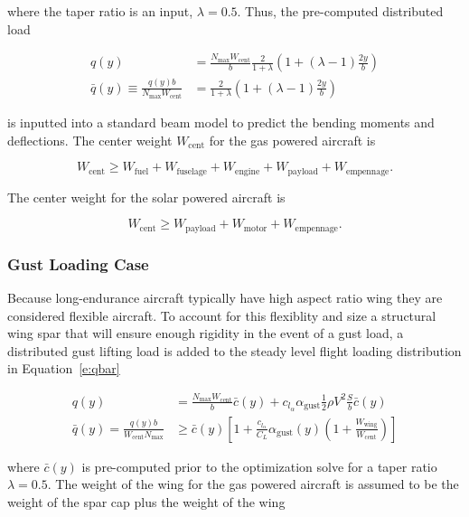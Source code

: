 \documentclass[]{aiaa-tc}%
\begin{document}
where the taper ratio is an input, $\lambda=0.5$.  Thus, the pre-computed distributed load 

\begin{align}
    \label{e:qbar}
    q(y) &= \frac{N_{\text{max}}W_{\text{cent}}}{b}\frac{2}{1+\lambda} \left( 1 + (\lambda - 1) \frac{2y}{b} \right) \\
    \bar{q}(y) \equiv \frac{q(y)b}{N_{\text{max}}W_{\text{cent}}} &= \frac{2}{1+\lambda} \left( 1 + (\lambda - 1) \frac{2y}{b} \right)
\end{align}

is inputted into a standard beam model to predict the bending moments and deflections. The center weight $W_{\text{cent}}$ for the gas powered aircraft is

\begin{equation}
    W_{\text{cent}} \geq W_{\text{fuel}} + W_{\text{fuselage}} + W_{\text{engine}} + W_{\text{payload}} + W_{\text{empennage}}.
\end{equation}

The center weight for the solar powered aircraft is

\begin{equation}
    W_{\text{cent}} \geq W_{\text{payload}} + W_{\text{motor}} + W_{\text{empennage}}.
\end{equation}


\subsubsection{Gust Loading Case}

Because long-endurance aircraft typically have high aspect ratio wing they are considered flexible aircraft. 
To account for this flexiblity and size a structural wing spar that will ensure enough rigidity in the event of a gust load, a distributed gust lifting load is added to the steady level flight loading distribution in Equation~\ref{e:qbar}

\begin{align}
    q(y) &= \frac{N_{\text{max}}W_{\text{cent}}}{b}\bar{c}(y) + c_{l_{\alpha}} \alpha_{\text{gust}} \frac{1}{2} \rho V^2 \frac{S}{b}\bar{c}(y) \\
    \bar{q}(y) = \frac{q(y)b}{W_{\text{cent}}N_{\text{max}}} &\geq \bar{c}(y) \left[1 + \frac{c_{l_{\alpha}}}{C_L} \alpha_{\text{gust}} (y) \left(1 + \frac{W_{\text{wing}}}{W_{\text{cent}}} \right) \right]
\end{align}

where $\bar{c}(y)$ is pre-computed prior to the optimization solve for a taper ratio $\lambda = 0.5$. The weight of the wing for the gas powered aircraft is assumed to be the weight of the spar cap plus the weight of the wing
\end{document}

